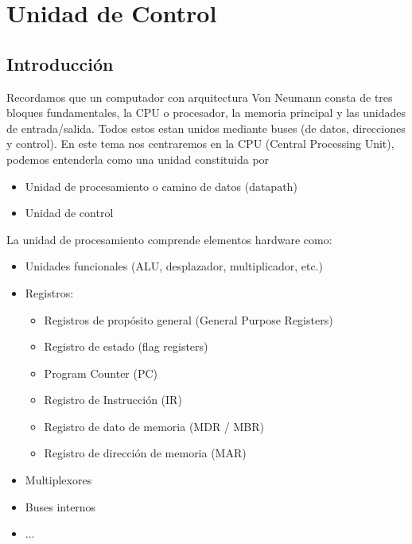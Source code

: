 \chapter{Unidad de Control}
\section{Introducción}
Recordamos que un computador con arquitectura Von Neumann consta de
tres bloques fundamentales, la CPU o procesador, la memoria principal y las unidades de entrada/salida.
Todos estos estan unidos mediante buses (de datos, direcciones y control).
En este tema nos centraremos en la CPU (Central Processing Unit), podemos entenderla como una unidad constituida por
\begin{itemize}
	\item Unidad de procesamiento o camino de datos (datapath)
	\item Unidad de control
\end{itemize}
La unidad de procesamiento comprende elementos hardware como:
\begin{itemize}
	\item Unidades funcionales (ALU, desplazador, multiplicador, etc.)
	\item Registros:
	      \begin{itemize}
		      \item Registros de propósito general (General Purpose Registers)
		      \item Registro de estado (flag registers)
		      \item Program Counter (PC)
		      \item Registro de Instrucción (IR)
		      \item Registro de dato de memoria (MDR / MBR)
		      \item Registro de dirección de memoria (MAR)
	      \end{itemize}
	\item Multiplexores
	\item Buses internos
	\item ...
\end{itemize}

